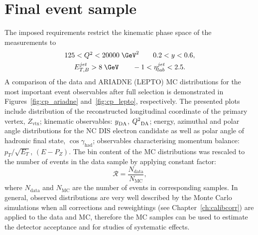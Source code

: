 \section{Final event sample}
\label{sec:eventsampletab}
The imposed requirements restrict the kinematic phase space of the measurements to
\begin{gather}
125 < \qsq < 20000\;\GeV^2 \qquad 0.2 < y < 0.6, \\
\etjetb > 8\;\GeV \qquad -1 < \etajetlab < 2.5.
\end{gather}
A comparison of the data and ARIADNE (LEPTO) MC distributions for the most important event observables after full selection is demonstrated in Figures~\ref{fig:cp_ariadne} and~\ref{fig:cp_lepto}, respectively. The presented plots include distribution of the reconstructed longitudinal coordinate of the primary vertex, $Z_\text{vtx}$; kinematic observables: $\mbox{${y}$}_\text{DA}$, $\mbox{${Q^2}$}_\text{DA}$; energy, azimuthal and polar angle distributions for the NC DIS electron candidate as well as polar angle of hadronic final state, $\cos{\gamma_\text{had}}$; observables characterising momentum balance: $p_T/\sqrt{E_T}$, $\left(E-P_Z\right)$. The bin content of the MC distributions was rescaled to the number of events in the data sample by applying constant factor:
\begin{equation}
\mathcal{R} = \frac{N_\text{data}}{N_\text{MC}},
\label{eq:mcrescale}
\end{equation}
where $N_\text{data}$ and $N_\text{MC}$ are the number of events in corresponding samples. In general, observed distributions are very well described by the Monte Carlo simulations when all corrections and reweightings (see Chapter~\ref{ch:calibcorr}) are applied to the data and MC, therefore the MC samples can be used to estimate the detector acceptance and for studies of systematic effects.


